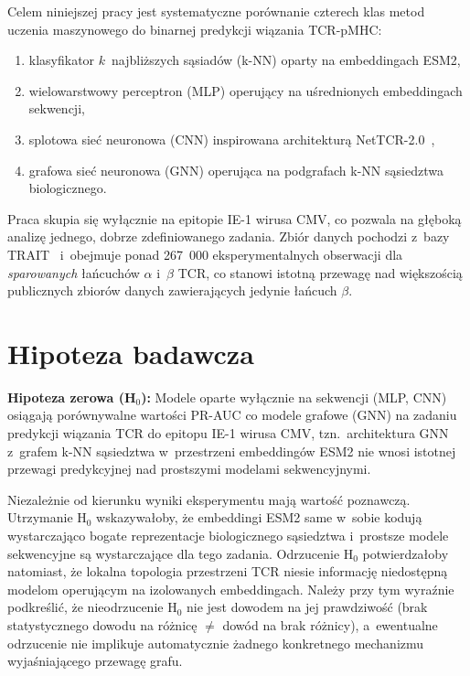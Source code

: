 \documentclass{SGGW-thesis}
\begin{document}
Celem niniejszej pracy jest systematyczne porównanie czterech klas metod uczenia maszynowego do binarnej
predykcji wiązania TCR-pMHC:
\begin{enumerate}
  \item klasyfikator $k$~najbliższych sąsiadów (k-NN) oparty na embeddingach ESM2,
  \item wielowarstwowy perceptron (MLP) operujący na uśrednionych embeddingach sekwencji,
  \item splotowa sieć neuronowa (CNN) inspirowana architekturą NetTCR-2.0~\cite{montemurro2022},
  \item grafowa sieć neuronowa (GNN) operująca na podgrafach k-NN sąsiedztwa biologicznego.
\end{enumerate}

Praca skupia się wyłącznie na epitopie IE-1 wirusa CMV, co pozwala na głęboką analizę jednego,
dobrze zdefiniowanego zadania. Zbiór danych pochodzi z~bazy TRAIT~\cite{trait} i~obejmuje ponad 267~000
eksperymentalnych obserwacji dla \textit{sparowanych} łańcuchów $\alpha$ i~$\beta$ TCR, co stanowi
istotną przewagę nad większością publicznych zbiorów danych zawierających jedynie łańcuch $\beta$.

\section{Hipoteza badawcza}

\textbf{Hipoteza zerowa (H$_0$):} Modele oparte wyłącznie na sekwencji (MLP, CNN) osiągają
porównywalne wartości PR-AUC co modele grafowe (GNN) na zadaniu predykcji wiązania TCR do
epitopu IE-1 wirusa CMV, tzn.\ architektura GNN z~grafem k-NN sąsiedztwa w~przestrzeni
embeddingów ESM2 nie wnosi istotnej przewagi predykcyjnej nad prostszymi modelami sekwencyjnymi.

Niezależnie od kierunku wyniki eksperymentu mają wartość poznawczą. Utrzymanie H$_0$
wskazywałoby, że embeddingi ESM2 same w~sobie kodują wystarczająco bogate reprezentacje
biologicznego sąsiedztwa i~prostsze modele sekwencyjne są wystarczające dla tego zadania.
Odrzucenie H$_0$ potwierdzałoby natomiast, że lokalna topologia przestrzeni TCR niesie
informację niedostępną modelom operującym na izolowanych embeddingach. Należy przy tym wyraźnie
podkreślić, że nieodrzucenie H$_0$ nie jest dowodem na jej prawdziwość (brak statystycznego
dowodu na różnicę $\neq$ dowód na brak różnicy), a~ewentualne odrzucenie nie implikuje
automatycznie żadnego konkretnego mechanizmu wyjaśniającego przewagę grafu.
\end{document}
